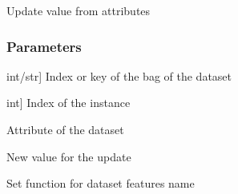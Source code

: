 \documentclass[letterpaper,10pt,english]{sphinxmanual}
\begin{document}
\begin{fulllineitems}
\begin{fulllineitems}
\begin{description}
\end{description}

\end{fulllineitems}


\begin{fulllineitems}
\label{\detokenize{data/_autosummary/miml.data.miml_dataset.MIMLDataset:miml.data.miml_dataset.MIMLDataset.set_attribute}}
\pysigstartsignatures
{}
\pysigstopsignatures
\sphinxAtStartPar
Update value from attributes


\subsubsection{Parameters}
\label{\detokenize{data/_autosummary/miml.data.miml_dataset.MIMLDataset:id31}}\begin{description}
\sphinxlineitem{bag}{[}int/str{]}
\sphinxAtStartPar
Index or key of the bag of the dataset

\sphinxlineitem{index\_instance}{[}int{]}
\sphinxAtStartPar
Index of the instance

\sphinxAtStartPar
Attribute of the dataset

\sphinxAtStartPar
New value for the update

\end{description}

\end{fulllineitems}


\begin{fulllineitems}
\label{\detokenize{data/_autosummary/miml.data.miml_dataset.MIMLDataset:miml.data.miml_dataset.MIMLDataset.set_features_name}}
\pysigstartsignatures
{}
\pysigstopsignatures
\sphinxAtStartPar
Set function for dataset features name



\end{fulllineitems}
\end{fulllineitems}
\end{document}
